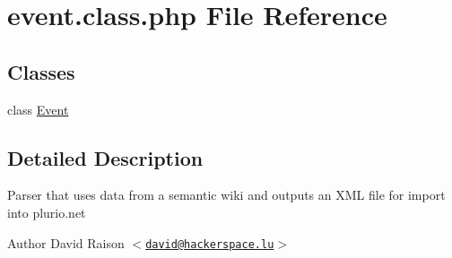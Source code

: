 \hypertarget{event_8class_8php}{
\section{event.class.php File Reference}
\label{event_8class_8php}
}
\subsection*{Classes}
\begin{DoxyCompactItemize}
\item 
class \hyperlink{classEvent}{Event}
\end{DoxyCompactItemize}


\subsection{Detailed Description}
Parser that uses data from a semantic wiki and outputs an XML file for import into plurio.net

\begin{DoxyAuthor}{Author}
David Raison $<$\href{mailto:david@hackerspace.lu}{\tt david@hackerspace.lu}$>$ 
\end{DoxyAuthor}
